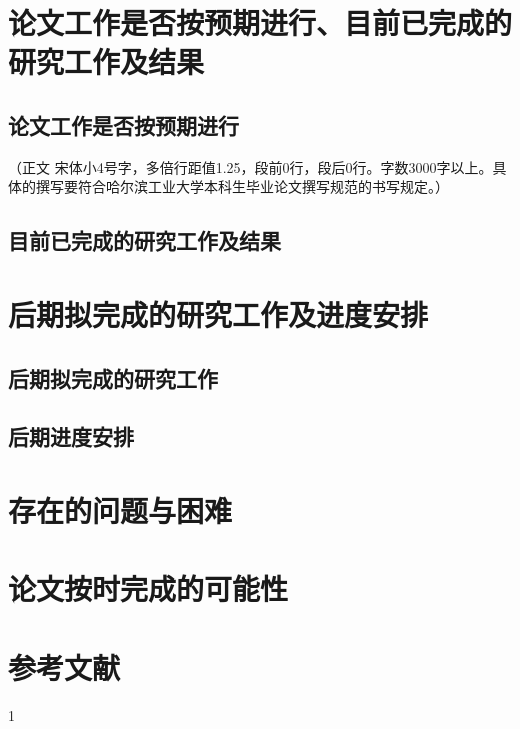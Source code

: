 \section{论文工作是否按预期进行、目前已完成的研究工作及结果}
\subsection{论文工作是否按预期进行}
（正文  宋体小4号字，多倍行距值1.25，段前0行，段后0行。字数3000字以上。具体的撰写要符合哈尔滨工业大学本科生毕业论文撰写规范的书写规定。）
\subsection{目前已完成的研究工作及结果}
\section{后期拟完成的研究工作及进度安排}
\subsection{后期拟完成的研究工作}
\subsection{后期进度安排}
\section{存在的问题与困难}
\section{论文按时完成的可能性}
\section{参考文献}
1




